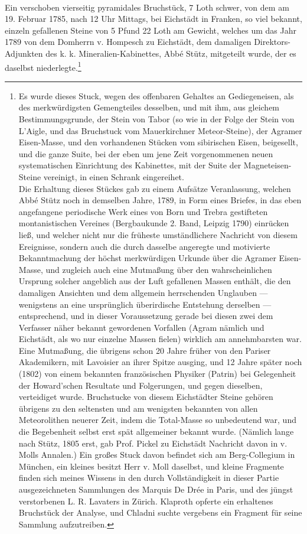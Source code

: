 \documentclass[a4paper, 11pt, oneside, german]{article}
\begin{document}
\paragraph{}
Ein verschoben vierseitig pyramidales Bruchstück, 7 Loth schwer, von dem am 19. Februar 1785, nach 12 Uhr Mittags, bei Eichstädt in Franken, so viel bekannt, einzeln gefallenen Steine von 5 Pfund 22 Loth am Gewicht, welches um das Jahr 1789 von dem Domherrn v. Hompesch zu Eichstädt, dem damaligen Direktors-Adjunkten des k. k. Mineralien-Kabinettes, Abbé Stütz, mitgeteilt wurde, der es daselbst niederlegte.\footnote{Es wurde dieses Stuck, wegen des offenbaren Gehaltes an Gediegeneisen, als des merkwürdigsten Gemengteiles desselben, und mit ihm, aus gleichem Bestimmungsgrunde, der Stein von Tabor (so wie in der Folge der Stein von L'Aigle, und das Bruchstuck vom Mauerkirchner Meteor-Steine), der Agramer Eisen-Masse, und den vorhandenen Stücken vom sibirischen Eisen, beigesellt, und die ganze Suite, bei der eben um jene Zeit vorgenommenen neuen systematischen Einrichtung des Kabinettes, mit der Suite der Magneteisen-Steine vereinigt, in einen Schrank eingereihet.\\
Die Erhaltung dieses Stückes gab zu einem Aufsätze Veranlassung, welchen Abbé Stütz noch in demselben Jahre, 1789, in Form eines Briefes, in das eben angefangene periodische Werk eines von Born und Trebra gestifteten montanistischen Vereines (Bergbaukunde 2. Band, Leipzig 1790) einrücken ließ, und welcher nicht nur die früheste umständlichere Nachricht von diesem Ereignisse, sondern auch die durch dasselbe angeregte und motivierte Bekanntmachung der höchst merkwürdigen Urkunde über die Agramer Eisen-Masse, und zugleich auch eine Mutmaßung über den wahrscheinlichen Ursprung solcher angeblich aus der Luft gefallenen Massen enthält, die den damaligen Ansichten und dem allgemein herrschenden Unglauben --- wenigstens an eine ursprünglich überirdische Entstehung derselben --- entsprechend, und in dieser Voraussetzung gerade bei diesen zwei dem Verfasser näher bekannt gewordenen Vorfallen (Agram nämlich und Eichstädt, als wo nur einzelne Massen fielen) wirklich am annehmbarsten war. Eine Mutmaßung, die übrigens schon 20 Jahre früher von den Pariser Akademikern, mit Lavoisier an ihrer Spitze ausging, und 12 Jahre später noch (1802) von einem bekannten französischen Physiker (Patrin) bei Gelegenheit der Howard'schen Resultate und Folgerungen, und gegen dieselben, verteidiget wurde.  
Bruchstucke von diesem Eichstädter Steine gehören übrigens zu den seltensten und am wenigsten bekannten von allen Meteorolithen neuerer Zeit, indem die Total-Masse so unbedeutend war, und die Begebenheit selbst erst spät allgemeiner bekannt wurde. (Nämlich lange nach Stütz, 1805 erst, gab Prof. Pickel zu Eichstädt Nachricht davon in v. Molls Annalen.) Ein großes Stuck davon befindet sich am Berg-Collegium in München, ein kleines besitzt Herr v. Moll daselbst, und kleine Fragmente finden sich meines Wissens in den durch Vollständigkeit in dieser Partie ausgezeichneten Sammlungen des Marquis De Drée in Paris, und des jüngst verstorbenen L. R. Lavaters in Zürich. Klaproth opferte ein erhaltenes Bruchstück der Analyse, und Chladni suchte vergebens ein Fragment für seine Sammlung aufzutreiben.}
\end{document}
